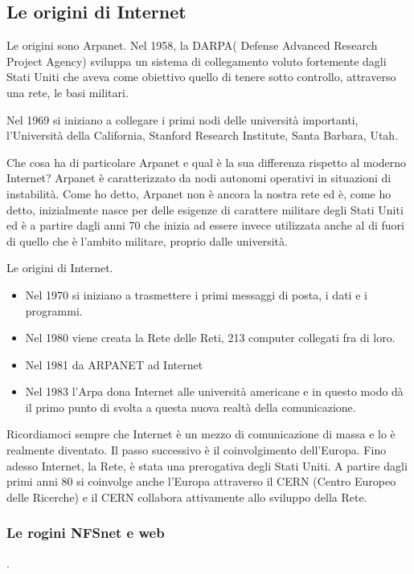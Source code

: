 \subsection{Le origini di Internet}
Le origini sono Arpanet. Nel 1958, la DARPA( Defense Advanced Research Project Agency) sviluppa un sistema di collegamento voluto fortemente dagli Stati Uniti che aveva come obiettivo quello di tenere sotto controllo, attraverso una rete, le basi militari. \par
Nel 1969 si iniziano a collegare i primi nodi delle università importanti, l'Università della California, Stanford Research Institute, Santa Barbara, Utah. \par
Che cosa ha di particolare Arpanet e qual è la sua differenza rispetto al moderno Internet? Arpanet è caratterizzato da nodi autonomi operativi in situazioni di instabilità. Come ho detto, Arpanet non è ancora la nostra rete ed è, come ho detto, inizialmente nasce per delle esigenze di carattere militare degli Stati Uniti ed è a partire dagli anni 70 che inizia ad essere invece utilizzata anche al di fuori di quello che è l'ambito militare, proprio dalle università. \par
Le origini di Internet. \par
\begin{itemize}
    \item Nel 1970 si iniziano a trasmettere i primi messaggi di posta, i dati e i programmi.
    \item Nel 1980 viene creata la Rete delle Reti, 213 computer collegati fra di loro.
    \item Nel 1981 da ARPANET ad Internet
    \item Nel 1983 l'Arpa dona Internet alle università americane e in questo modo dà il primo punto di svolta a questa nuova realtà della comunicazione.
\end{itemize}

Ricordiamoci sempre che Internet è un mezzo di comunicazione di massa e lo è realmente diventato. Il passo successivo è il coinvolgimento dell'Europa. Fino adesso Internet, la Rete, è stata una prerogativa degli Stati Uniti. A partire dagli primi anni 80 si coinvolge anche l'Europa attraverso il CERN (Centro Europeo delle Ricerche) e il CERN collabora attivamente allo sviluppo della Rete.
\subsubsection{Le rogini NFSnet e web}.

